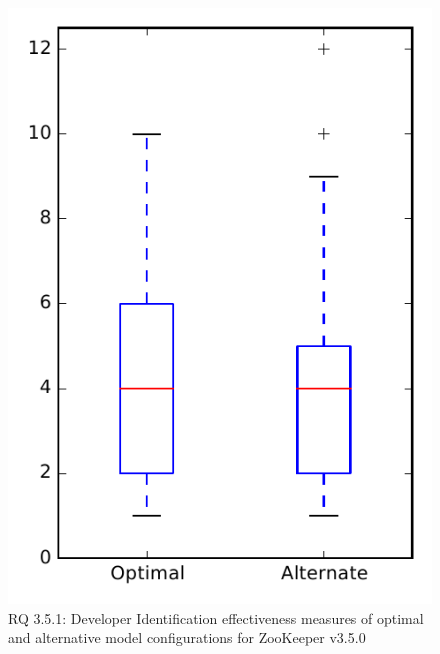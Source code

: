 
\begin{figure}
\centering
\includegraphics[height=0.4\textheight]{figures/combo/dit_rq1_zookeeper}
\caption{RQ 3.5.1: Developer Identification effectiveness measures of optimal and alternative model configurations for ZooKeeper v3.5.0}
\label{fig:combo:dit:rq1:zookeeper}
\end{figure}
